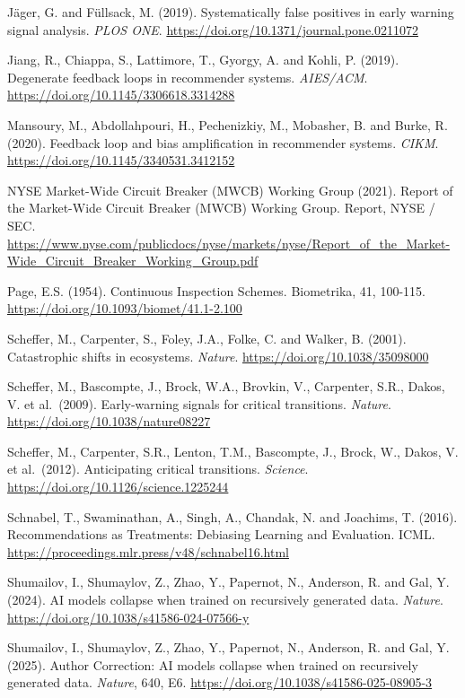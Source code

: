 \documentclass[
  11pt,
]{article}
\begin{document}
Jäger, G. and Füllsack, M. (2019). Systematically false positives in
early warning signal analysis. \emph{PLOS ONE}.
\url{https://doi.org/10.1371/journal.pone.0211072}

Jiang, R., Chiappa, S., Lattimore, T., Gyorgy, A. and Kohli, P. (2019).
Degenerate feedback loops in recommender systems. \emph{AIES/ACM}.
\url{https://doi.org/10.1145/3306618.3314288}

Mansoury, M., Abdollahpouri, H., Pechenizkiy, M., Mobasher, B. and
Burke, R. (2020). Feedback loop and bias amplification in recommender
systems. \emph{CIKM}. \url{https://doi.org/10.1145/3340531.3412152}

NYSE Market-Wide Circuit Breaker (MWCB) Working Group (2021). Report of
the Market-Wide Circuit Breaker (MWCB) Working Group. Report, NYSE /
SEC.
\url{https://www.nyse.com/publicdocs/nyse/markets/nyse/Report_of_the_Market-Wide_Circuit_Breaker_Working_Group.pdf}

Page, E.S. (1954). Continuous Inspection Schemes. Biometrika, 41,
100-115. \url{https://doi.org/10.1093/biomet/41.1-2.100}

Scheffer, M., Carpenter, S., Foley, J.A., Folke, C. and Walker, B.
(2001). Catastrophic shifts in ecosystems. \emph{Nature}.
\url{https://doi.org/10.1038/35098000}

Scheffer, M., Bascompte, J., Brock, W.A., Brovkin, V., Carpenter, S.R.,
Dakos, V. et al.~(2009). Early-warning signals for critical transitions.
\emph{Nature}. \url{https://doi.org/10.1038/nature08227}

Scheffer, M., Carpenter, S.R., Lenton, T.M., Bascompte, J., Brock, W.,
Dakos, V. et al.~(2012). Anticipating critical transitions.
\emph{Science}. \url{https://doi.org/10.1126/science.1225244}

Schnabel, T., Swaminathan, A., Singh, A., Chandak, N. and Joachims, T.
(2016). Recommendations as Treatments: Debiasing Learning and
Evaluation. ICML.
\url{https://proceedings.mlr.press/v48/schnabel16.html}

Shumailov, I., Shumaylov, Z., Zhao, Y., Papernot, N., Anderson, R. and
Gal, Y. (2024). AI models collapse when trained on recursively generated
data. \emph{Nature}. \url{https://doi.org/10.1038/s41586-024-07566-y}

Shumailov, I., Shumaylov, Z., Zhao, Y., Papernot, N., Anderson, R. and
Gal, Y. (2025). Author Correction: AI models collapse when trained on
recursively generated data. \emph{Nature}, 640, E6.
\url{https://doi.org/10.1038/s41586-025-08905-3}
\end{document}
